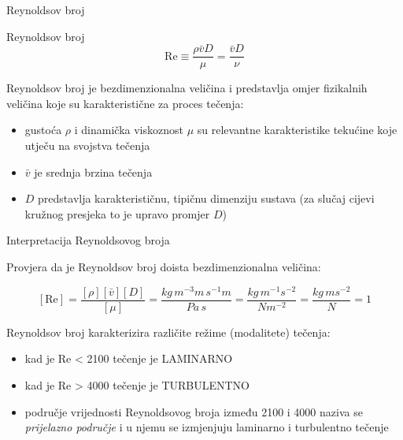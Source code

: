 \documentclass{beamer}
\begin{document}
\begin{frame}{Reynoldsov broj}

\begin{definition}
Reynoldsov broj
\[
\mathrm{Re}\equiv\frac{\rho\bar{v}D}{\mu}=\frac{\bar{v}D}{\nu}
\]
\end{definition}

Reynoldsov broj je \alert{bezdimenzionalna veličina} i predstavlja
omjer fizikalnih veličina koje su karakteristične za proces tečenja:
\begin{itemize}
\item gustoća $\rho$ i dinamička viskoznost $\mu$ su relevantne karakteristike
tekućine koje utječu na svojstva tečenja
\item $\bar{v}$ je srednja brzina tečenja
\item $D$ predstavlja karakterističnu, tipičnu dimenziju sustava (za slučaj
cijevi kružnog presjeka to je upravo promjer $D$)
\end{itemize}
\end{frame}

\begin{frame}{Interpretacija Reynoldsovog broja}

Provjera da je Reynoldsov broj doista bezdimenzionalna veličina:

\[
[\mathrm{Re}]=\frac{[\rho][\bar{v}][D]}{[\mu]}=\frac{kg\,m^{-3}m\,s^{-1}m}{Pa\,s}=\frac{kg\,m^{-1}s^{-2}}{Nm^{-2}}=\frac{kg\,ms^{-2}}{N}=1
\]

\begin{alertblock}{Reynoldsov broj karakterizira različite režime (modalitete) tečenja:}

\begin{itemize}
\item kad je Re < 2100 tečenje je LAMINARNO
\item kad je Re > 4000 tečenje je TURBULENTNO
\end{itemize}
\end{alertblock}
\begin{itemize}
\item područje vrijednosti Reynoldsovog broja između 2100 i 4000 naziva
se \emph{prijelazno područje} i u njemu se izmjenjuju laminarno i
turbulentno tečenje
\end{itemize}
\end{frame}
\end{document}
